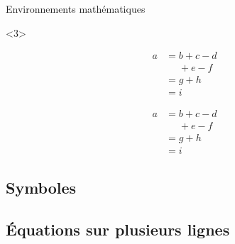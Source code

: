\begin{frame}[fragile]{Environnements mathématiques}
	\begin{onlyenv}
\begin{codesource}
	\begin{equation}
		\begin{split}
			a &= b + c - d \\
			&\phantom{=} + e - f \\
			&= g + h \\
			&= i
		\end{split}
	\end{equation}
\end{codesource}
		\begin{equation}
			\begin{split}
				a &= b + c - d \\
				&\phantom{=} + e - f \\
				&= g + h \\
				&= i
			\end{split}
		\end{equation}
	\end{onlyenv}
\end{frame}

\subsection{Symboles}



\subsection{Équations sur plusieurs lignes}